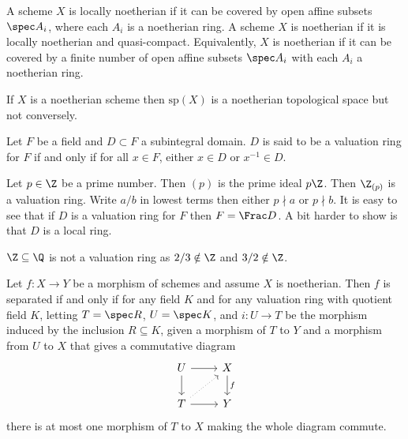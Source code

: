 \begin{dfn}
A scheme $X$ is locally noetherian if it can be covered by open affine subsets $\spec A_i$, where each $A_i$ is a noetherian ring. A scheme $X$ is noetherian if it is locally noetherian and quasi-compact. Equivalently, $X$ is noetherian if it can be covered by a finite number of open affine subsets $\spec A_i$ with each $A_i$ a noetherian ring. 
\end{dfn}

\begin{rem}
If $X$ is a noetherian scheme then $\text{sp}(X)$ is a noetherian topological space but not conversely. 
\end{rem}

\begin{dfn}
Let $F$ be a field and $D \subset F$ a subintegral domain. $D$ is said to be a valuation ring for $F$ if and only if for all $x \in F$, either $x \in D$ or $x^{-1} \in D$.
\end{dfn}

\begin{ex}
Let $p \in \Z$ be a prime number. Then $(p)$ is the prime ideal $p\Z$. Then $\Z_{(p)}$ is a valuation ring. Write $a/b$ in lowest terms then either $p\nmid a$ or $p \nmid b$. It is easy to see that if $D$ is a valuation ring for $F$ then $F=\Frac D$. A bit harder to show is that $D$ is a local ring. 
\end{ex}

\begin{ex}
$\Z \subseteq \Q$ is not a valuation ring as $2/3 \notin \Z$ and $3/2 \notin \Z$.
\end{ex}


\begin{prop}
Let $f: X \to Y$ be a morphism of schemes and assume $X$ is noetherian. Then $f$ is separated if and only if for any field $K$ and for any valuation ring with quotient field $K$, letting $T=\spec R$, $U=\spec K$, and $i: U \to T$ be the morphism induced by the inclusion $R \subseteq K$, given a morphism of $T$ to $Y$ and a morphism from $U$ to $X$ that gives a commutative diagram
	\[
	\begin{tikzcd}
	U \arrow{d} \arrow{r} & X \arrow{d}{f} \\
	T \arrow[dotted]{ur} \arrow{r} & Y 
	\end{tikzcd}
	\]
there is at most one morphism of $T$ to $X$ making the whole diagram commute. 
\end{prop}


